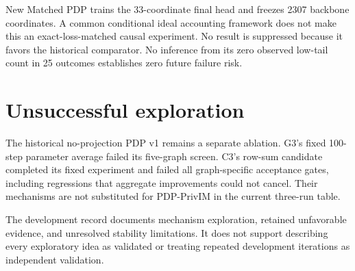 New Matched PDP trains the 33-coordinate final head and freezes 2307 backbone coordinates. A common conditional ideal accounting framework does not make this an exact-loss-matched causal experiment. No result is suppressed because it favors the historical comparator. No inference from its zero observed low-tail count in 25 outcomes establishes zero future failure risk.

\section{Unsuccessful exploration}
The historical no-projection PDP v1 remains a separate ablation. G3's fixed 100-step parameter average failed its five-graph screen. C3's row-sum candidate completed its fixed experiment and failed all graph-specific acceptance gates, including regressions that aggregate improvements could not cancel. Their mechanisms are not substituted for PDP-PrivIM in the current three-run table.

The development record documents mechanism exploration, retained unfavorable evidence, and unresolved stability limitations. It does not support describing every exploratory idea as validated or treating repeated development iterations as independent validation.
